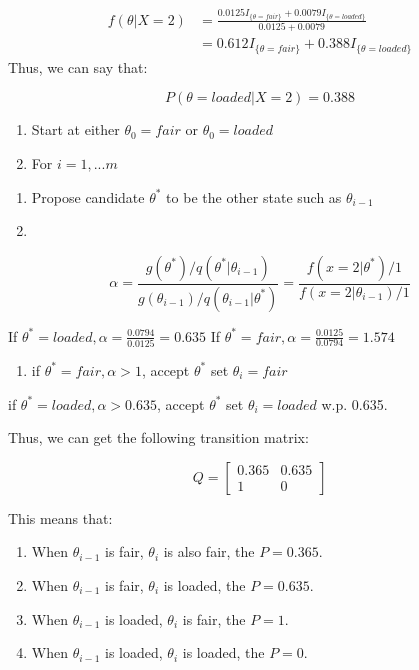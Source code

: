 \documentclass[
]{book}
\providecommand{\tightlist}{%
  \setlength{\itemsep}{0pt}\setlength{\parskip}{0pt}}
\begin{document}
\[\begin{aligned} f(\theta |X=2) &=\frac{0.0125 I_{\{\theta=fair \}}+0.0079 I_{\{\theta=loaded \}} }{0.0125+0.0079} \\ &= 0.612 I_{\{\theta=fair \}} + 0.388 I_{\{\theta=loaded \}} \end{aligned}\]
Thus, we can say that:

\[P(\theta=loaded | X=2)=0.388\]

\begin{enumerate}
\def\labelenumi{(\arabic{enumi})}
\item
  Start at either \(\theta_0=fair\) or \(\theta_0=loaded\)
\item
  For \(i=1, ...m\)
\end{enumerate}

\begin{enumerate}
\def\labelenumi{(\alph{enumi})}
\item
  Propose candidate \(\theta^*\) to be the other state such as \(\theta_{i-1}\)
\item
\end{enumerate}

\[\alpha=\frac{g(\theta^*)/q(\theta^*|\theta_{i-1})}{g(\theta_{i-1})/q(\theta_{i-1}|\theta^*)}=\frac{f(x=2|\theta^*)/1}{f(x=2|\theta_{i-1})/1}\]

If \(\theta^*=loaded, \alpha=\frac{0.0794}{0.0125}=0.635\)
If \(\theta^*=fair, \alpha=\frac{0.0125}{0.0794}=1.574\)

\begin{enumerate}
\def\labelenumi{(\alph{enumi})}
\setcounter{enumi}{2}
\tightlist
\item
  if \(\theta^*=fair, \alpha>1\), accept \(\theta^*\) set \(\theta_i=fair\)
\end{enumerate}

if \(\theta^*=loaded, \alpha>0.635\), accept \(\theta^*\) set \(\theta_i=loaded\) w.p. 0.635.

Thus, we can get the following transition matrix:

\[Q=\begin{bmatrix} 0.365 & 0.635  \\ 1 & 0  \end{bmatrix}\]

This means that:

\begin{enumerate}
\def\labelenumi{(\arabic{enumi})}
\item
  When \(\theta_{i-1}\) is fair, \(\theta_{i}\) is also fair, the \(P=0.365\).
\item
  When \(\theta_{i-1}\) is fair, \(\theta_{i}\) is loaded, the \(P=0.635\).
\item
  When \(\theta_{i-1}\) is loaded, \(\theta_{i}\) is fair, the \(P=1\).
\item
  When \(\theta_{i-1}\) is loaded, \(\theta_{i}\) is loaded, the \(P=0\).
\end{enumerate}
\end{document}
